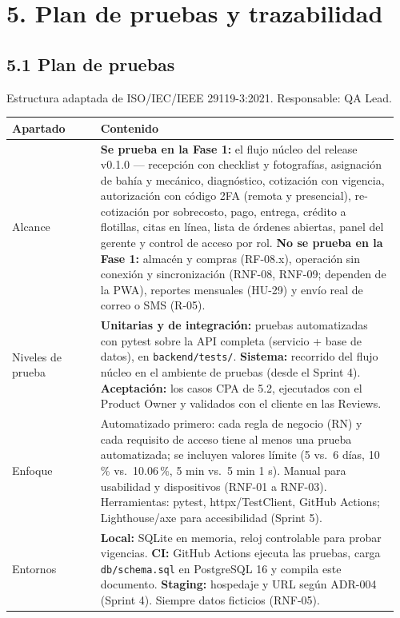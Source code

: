 \section{5. Plan de pruebas y
trazabilidad}\label{plan-de-pruebas-y-trazabilidad}

\subsection{5.1 Plan de pruebas}\label{plan-de-pruebas}

Estructura adaptada de ISO/IEC/IEEE 29119-3:2021. Responsable: QA Lead.

{\small
\begin{longtable}{@{}L{0.22\linewidth}L{0.74\linewidth}@{}}
\toprule
\textbf{Apartado} & \textbf{Contenido} \\
\midrule
\endhead
\bottomrule
\endlastfoot
Alcance & \textbf{Se prueba en la Fase 1:} el flujo núcleo del release v0.1.0 --- recepción con checklist y
fotografías, asignación de bahía y mecánico, diagnóstico, cotización con vigencia, autorización con código
2FA (remota y presencial), re-cotización por sobrecosto, pago, entrega, crédito a flotillas, citas en línea,
lista de órdenes abiertas, panel del gerente y control de acceso por rol.
\textbf{No se prueba en la Fase 1:} almacén y compras (RF-08.x), operación sin conexión y sincronización
(RNF-08, RNF-09; dependen de la PWA), reportes mensuales (HU-29) y envío real de correo o SMS (R-05). \\
Niveles de prueba & \textbf{Unitarias y de integración:} pruebas automatizadas con pytest sobre la API completa
(servicio + base de datos), en \texttt{backend/tests/}. \textbf{Sistema:} recorrido del flujo núcleo en el
ambiente de pruebas (desde el Sprint 4). \textbf{Aceptación:} los casos CPA de 5.2, ejecutados con el
Product Owner y validados con el cliente en las Reviews. \\
Enfoque & Automatizado primero: cada regla de negocio (RN) y cada requisito de acceso tiene al menos una
prueba automatizada; se incluyen valores límite (5 vs.\ 6 días, 10\,\% vs.\ 10.06\,\%, 5 min vs.\ 5 min 1 s).
Manual para usabilidad y dispositivos (RNF-01 a RNF-03). Herramientas: pytest, httpx/TestClient,
GitHub Actions; Lighthouse/axe para accesibilidad (Sprint 5). \\
Entornos & \textbf{Local:} SQLite en memoria, reloj controlable para probar vigencias.
\textbf{CI:} GitHub Actions ejecuta las pruebas, carga \texttt{db/schema.sql} en PostgreSQL 16 y compila este
documento. \textbf{Staging:} hospedaje y URL según ADR-004 (Sprint 4). Siempre datos ficticios (RNF-05). \\

\end{longtable}}
